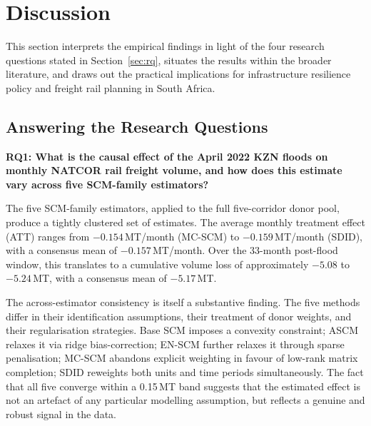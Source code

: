 
\section{Discussion}
\label{sec:discussion}

This section interprets the empirical findings in light of the four
research questions stated in Section~\ref{sec:rq}, situates the
results within the broader literature, and draws out the practical
implications for infrastructure resilience policy and freight rail
planning in South Africa.

\subsection{Answering the Research Questions}
\label{sec:disc_rq}

\textbf{RQ1: What is the causal effect of the April 2022 KZN floods
on monthly NATCOR rail freight volume, and how does this estimate
vary across five SCM-family estimators?}

The five SCM-family estimators, applied to the full five-corridor
donor pool, produce a tightly clustered set of estimates.
The average monthly treatment effect (ATT) ranges from
$-0.154$\,MT/month (MC-SCM) to $-0.159$\,MT/month (SDID), with a
consensus mean of $-0.157$\,MT/month.
Over the 33-month post-flood window, this translates to a cumulative
volume loss of approximately $-5.08$ to $-5.24$\,MT, with a
consensus mean of $-5.17$\,MT.

The across-estimator consistency is itself a substantive finding.
The five methods differ in their identification assumptions, their
treatment of donor weights, and their regularisation strategies.
Base SCM imposes a convexity constraint; ASCM relaxes it via
ridge bias-correction; EN-SCM further relaxes it through sparse
penalisation; MC-SCM abandons explicit weighting in favour of
low-rank matrix completion; SDID reweights both units and time
periods simultaneously.
The fact that all five converge within a 0.15\,MT band suggests
that the estimated effect is not an artefact of any particular
modelling assumption, but reflects a genuine and robust signal in
the data.

